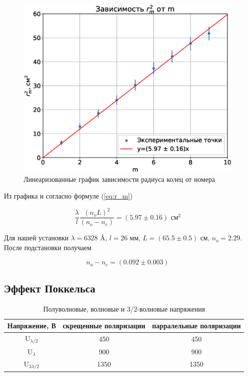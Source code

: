 \documentclass{article}
\begin{document}
\newpage

\begin{figure}[h]
    \center\includegraphics[width = 0.9\linewidth]{r_m.eps}
    \caption{Линеаризованные график зависимости радиуса колец от номера}\label{fig:r_m}
\end{figure}

Из графика и согласно формуле (\ref{eq:r_m})

\begin{equation*}
    \frac{\lambda}{l} \frac{{(n_o L)}^2}{(n_o - n_e)} = (5.97 \pm 0.16) \text{ см}^2
\end{equation*}

Для нашей установки $\lambda = 6328$ \AA, $l = 26$ мм, $L = (65.5 \pm 0.5)$ см,
$n_o = 2.29$. После подстановки получаем

\begin{equation}
    n_o - n_e = (0.092 \pm 0.003)
\end{equation}

\subsection{Эффект Поккельса}

\begin{table}[h]
\begin{center}
\begin{tabular}{ccc}
\toprule
Напряжение, В & скрещенные поляризации & парралельные поляризации\\
\midrule
U$_{\lambda/2}$ & 450 & 450\\
U$_{\lambda}$ & 900 & 900 \\
U$_{3\lambda/2}$ & 1350 & 1350\\
\bottomrule
\end{tabular}
\caption{Полуволновые, волновые и 3/2-волновые напряжения}
\end{center}
\end{table}
\end{document}
